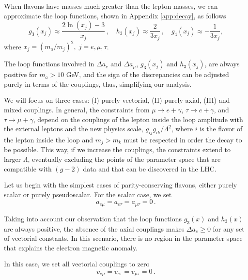 \documentclass[prd,amsfonts,onecolumn,superscriptaddress,aps,nofootinbib,11pt]{revtex4-1}
\begin{document}
When flavons have masses much greater than the lepton masses, we can approximate the loop functions, shown in Appendix \ref{app:decay}, as follows
\begin{equation}
    g_3(x_j) \approx \frac{2 \ln(x_j) - 3}{x_j} \,, \quad h_3(x_j) \approx \frac{2}{3x_j} \,, \quad g_4(x_j)\approx -\frac{1}{3x_j},
\end{equation}
where $x_j=(m_a/m_j)^2,\; j=e,\mu,\tau$.

The loop functions involved in $\Delta a_e$ and $\Delta a_\mu$, $g_3(x_j)$ and $h_3(x_j)$, are always positive for $m_a>10$ GeV, and the sign of the discrepancies can be adjusted purely in terms of the couplings, thus, simplifying our analysis.

We will focus on three cases: (I) purely vectorial, (II) purely axial, (III) and mixed couplings. In general, the constraints from $\mu\to e+\gamma$, $\tau\to e+\gamma$, and $\tau\to \mu+\gamma$, depend on the couplings of the lepton inside the loop amplitude with the external leptons and the new physics scale, $g_{ij}g_{ik}/\Lambda^2$, where $i$ is the flavor of the lepton inside the loop and $m_j>m_k$ must be respected in order the decay to be possible. This way, if we increase the couplings, the constraints extend to larger $\Lambda$, eventually excluding the points of the parameter space that are compatible with $(g-2)$ data and that can be discovered in the LHC.

\vskip0.5cm


Let us begin with the simplest cases of parity-conserving flavons, either purely scalar or purely pseudoscalar. For the scalar case, we set
\begin{equation}
    a_{e \mu} = a_{e \tau} = a_{\mu \tau} = 0 \,.
\end{equation}

Taking into account our observation that the loop functions $g_3(x)$ and $h_3(x)$ are always positive, the absence of the axial couplings makes $\Delta a_e \geq 0$ for any set of vectorial constants. In this scenario, there is no region in the parameter space that explains the electron magnetic anomaly. 
\vskip0.5cm

In this case, we set all vectorial couplings to zero
\begin{equation}
    v_{e \mu} = v_{e \tau} = v_{\mu \tau} = 0 \,.
\end{equation}
\end{document}
